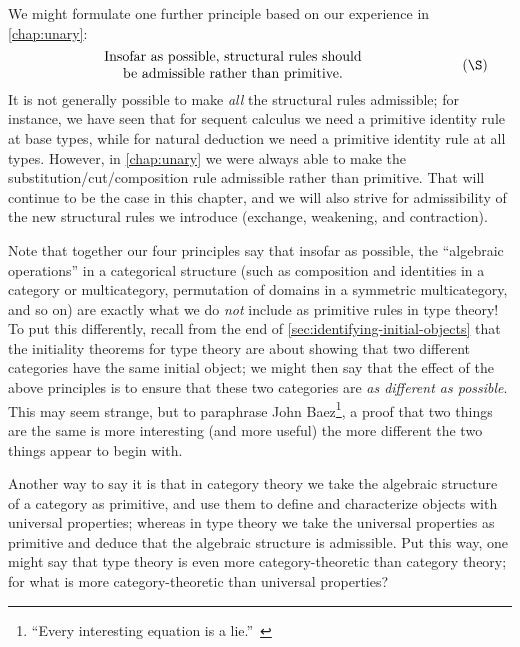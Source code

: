 We might formulate one further principle based on our experience in \cref{chap:unary}:
\begin{equation}\label{princ:adm}
  \parbox{4in}{\centering Insofar as possible, structural rules should\\ be admissible rather than primitive.}\tag{\S}
\end{equation}
It is not generally possible to make \emph{all} the structural rules admissible; for instance, we have seen that for sequent calculus we need a primitive identity rule at base types, while for natural deduction we need a primitive identity rule at all types.
However, in \cref{chap:unary} we were always able to make the substitution/cut/composition rule admissible rather than primitive.
That will continue to be the case in this chapter, and we will also strive for admissibility of the new structural rules we introduce (exchange, weakening, and contraction).

Note that together our four principles say that insofar as possible, the ``algebraic operations'' in a categorical structure (such as composition and identities in a category or multicategory, permutation of domains in a symmetric multicategory, and so on) are exactly what we do \emph{not} include as primitive rules in type theory!
To put this differently, recall from the end of \cref{sec:identifying-initial-objects} that the initiality theorems for type theory are about showing that two different categories have the same initial object; we might then say that the effect of the above principles is to ensure that these two categories are \emph{as different as possible}.
This may seem strange, but to paraphrase John Baez\footnote{``Every interesting equation is a lie.''~\cite{baez:why-ncats}}, a proof that two things are the same is more interesting (and more useful) the more different the two things appear to begin with.

Another way to say it is that in category theory we take the algebraic structure of a category as primitive, and use them to define and characterize objects with universal properties; whereas in type theory we take the universal properties as primitive and deduce that the algebraic structure is admissible.
Put this way, one might say that type theory is even more category-theoretic than category theory; for what is more category-theoretic than universal properties?

